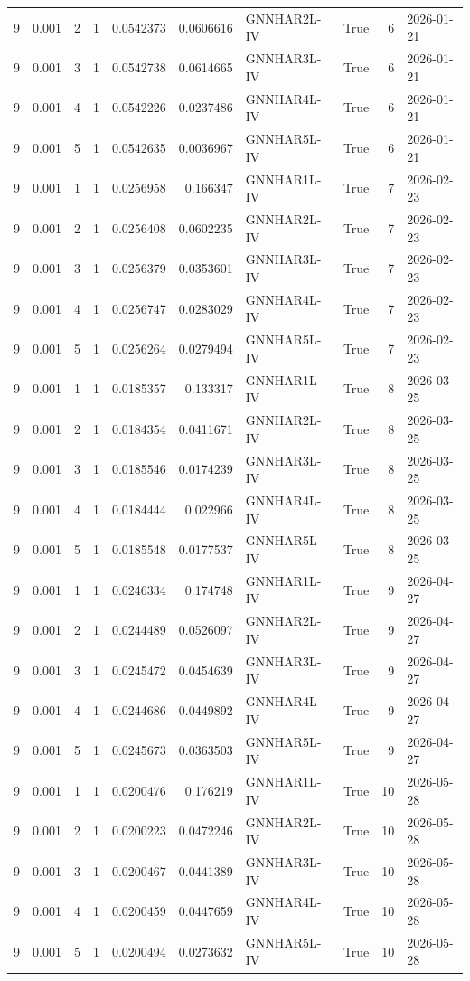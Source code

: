 \begin{tabular}{rrrrrrlrrl}
9 & 0.001 & 2 & 1 & 0.0542373 & 0.0606616 & GNNHAR2L-IV & True & 6 & 2026-01-21 \\
9 & 0.001 & 3 & 1 & 0.0542738 & 0.0614665 & GNNHAR3L-IV & True & 6 & 2026-01-21 \\
9 & 0.001 & 4 & 1 & 0.0542226 & 0.0237486 & GNNHAR4L-IV & True & 6 & 2026-01-21 \\
9 & 0.001 & 5 & 1 & 0.0542635 & 0.0036967 & GNNHAR5L-IV & True & 6 & 2026-01-21 \\
9 & 0.001 & 1 & 1 & 0.0256958 & 0.166347 & GNNHAR1L-IV & True & 7 & 2026-02-23 \\
9 & 0.001 & 2 & 1 & 0.0256408 & 0.0602235 & GNNHAR2L-IV & True & 7 & 2026-02-23 \\
9 & 0.001 & 3 & 1 & 0.0256379 & 0.0353601 & GNNHAR3L-IV & True & 7 & 2026-02-23 \\
9 & 0.001 & 4 & 1 & 0.0256747 & 0.0283029 & GNNHAR4L-IV & True & 7 & 2026-02-23 \\
9 & 0.001 & 5 & 1 & 0.0256264 & 0.0279494 & GNNHAR5L-IV & True & 7 & 2026-02-23 \\
9 & 0.001 & 1 & 1 & 0.0185357 & 0.133317 & GNNHAR1L-IV & True & 8 & 2026-03-25 \\
9 & 0.001 & 2 & 1 & 0.0184354 & 0.0411671 & GNNHAR2L-IV & True & 8 & 2026-03-25 \\
9 & 0.001 & 3 & 1 & 0.0185546 & 0.0174239 & GNNHAR3L-IV & True & 8 & 2026-03-25 \\
9 & 0.001 & 4 & 1 & 0.0184444 & 0.022966 & GNNHAR4L-IV & True & 8 & 2026-03-25 \\
9 & 0.001 & 5 & 1 & 0.0185548 & 0.0177537 & GNNHAR5L-IV & True & 8 & 2026-03-25 \\
9 & 0.001 & 1 & 1 & 0.0246334 & 0.174748 & GNNHAR1L-IV & True & 9 & 2026-04-27 \\
9 & 0.001 & 2 & 1 & 0.0244489 & 0.0526097 & GNNHAR2L-IV & True & 9 & 2026-04-27 \\
9 & 0.001 & 3 & 1 & 0.0245472 & 0.0454639 & GNNHAR3L-IV & True & 9 & 2026-04-27 \\
9 & 0.001 & 4 & 1 & 0.0244686 & 0.0449892 & GNNHAR4L-IV & True & 9 & 2026-04-27 \\
9 & 0.001 & 5 & 1 & 0.0245673 & 0.0363503 & GNNHAR5L-IV & True & 9 & 2026-04-27 \\
9 & 0.001 & 1 & 1 & 0.0200476 & 0.176219 & GNNHAR1L-IV & True & 10 & 2026-05-28 \\
9 & 0.001 & 2 & 1 & 0.0200223 & 0.0472246 & GNNHAR2L-IV & True & 10 & 2026-05-28 \\
9 & 0.001 & 3 & 1 & 0.0200467 & 0.0441389 & GNNHAR3L-IV & True & 10 & 2026-05-28 \\
9 & 0.001 & 4 & 1 & 0.0200459 & 0.0447659 & GNNHAR4L-IV & True & 10 & 2026-05-28 \\
9 & 0.001 & 5 & 1 & 0.0200494 & 0.0273632 & GNNHAR5L-IV & True & 10 & 2026-05-28 \\
\bottomrule
\end{tabular}
